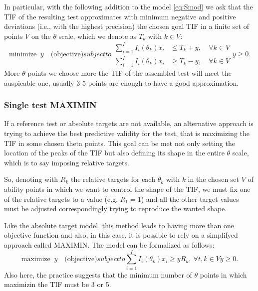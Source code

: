 In particular, with the following addition to the model \eqref{eq:Smod} we ask that the TIF of the resulting test approximates with minimum negative and positive deviations (i.e., with the highest precision) the chosen goal TIF in a finite set of points $V$ on the $\theta$ scale, which we denote as $T_{k}$ with $k \in V$:
\begin{subequations}[intermezzo]
	\begin{equation}
	\mbox{minimize } \ y \quad \mbox{(objective)}
	\end{equation}
	subject to
	\begin{alignat}{2}
	\label{eq:SMINIMAX1}
	\sum_{i=1}^I I_i(\theta_{k}) x_{i} & \le T_{k}+ y, &\ \forall k \in V \\
	\label{eq:SMINIMAX2}
	\sum_{i=1}^I I_i(\theta_{k}) x_{i} & \ge T_{k}- y, &\ \forall k \in V
	\end{alignat}
	\begin{equation*}
	y \ge 0.
	\end{equation*}
	\label{eq:SMINIMAX}
\end{subequations}
More $\theta$ points we choose more the TIF of the assembled test will meet the auspicable one, usually 3-5 points are enough to have a good approximation.

\subsubsection{Single test MAXIMIN}\label{sec:single-test-maximin}
If a reference test or absolute targets are not available, an alternative approach is trying to achieve the best predictive validity for the test, that is maximizing the TIF in some chosen theta points.
This goal can be met not only setting the location of the peaks of the TIF but also defining its shape in the entire $\theta$ scale, which is to say imposing relative targets.

So, denoting with $R_k$ the relative targets for each $\theta_k$ with $k$ in the chosen set $V$ of ability points in which we want to control the shape of the TIF, we must fix one of the relative targets to a value (e.g. $R_1=1$) and all the other target values must be adjusted correspondingly trying to reproduce the wanted shape.

Like the absolute target model, this method leads to having more than one objective function and also, in this case, it is possible to rely on a simplifyed approach called MAXIMIN.
The model can be formalized as follows:
\begin{subequations}\label{eq:MAXIMIN}
	\begin{equation}
	\mbox{maximize } \ y \quad \mbox{(objective)}
	\end{equation}
	subject to
	\begin{equation}\label{eq:SMAXIMIN1}
	\sum_{i=1}^I I_i(\theta_{k}) x_{i} \ge yR_{k}, \ \forall t,k \in V
	\end{equation}
	\begin{equation*}
	y \ge 0.
	\end{equation*}
	\label{eq:SMAXIMIN}
\end{subequations}
Also here, the practice suggests that the minimum number of $\theta$ points in which maximizin the TIF must be 3 or 5.

